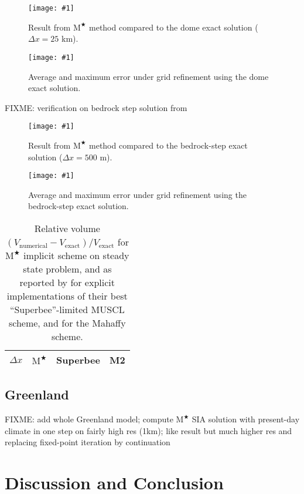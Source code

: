 \documentclass[twocolumn,letterpaper]{igs}
\newcommand{\onecol}[1]{\texttt{[image: \#1]}}
\newcommand{\Mstar}{$\text{M}^{\bigstar}$\xspace}
\begin{document}
\begin{figure}[ht]
\onecol{domeprofile.pdf}
\caption{Result from \Mstar method compared to the dome exact solution ($\Delta x=25$ km).}
\label{fig:domeprofile}
\end{figure}

\begin{figure}[ht]
\onecol{domeverif.pdf}
\caption{Average and maximum error under grid refinement using the dome exact solution.}
\label{fig:domeverif}
\end{figure}

FIXME: verification on bedrock step solution from \cite{JaroschSchoofAnslow2013}

\begin{figure}[ht]
\onecol{bedstepprofile.pdf}
\caption{Result from \Mstar method compared to the bedrock-step exact solution ($\Delta x=500$ m).}
\label{fig:bedstepprofile}
\end{figure}

\begin{figure}[ht]
\onecol{bedstepverif.pdf}
\caption{Average and maximum error under grid refinement using the bedrock-step exact solution.}
\label{fig:bedstepverif}
\end{figure}

\begin{table}[ht]
  \caption{Relative volume $(V_{\text{numerical}} - V_{\text{exact}}) / V_{\text{exact}}$ for \Mstar implicit scheme on steady state problem, and as reported by \cite{JaroschSchoofAnslow2013} for explicit implementations of their best ``Superbee''-limited MUSCL scheme, and for the Mahaffy scheme.}
  \vskip4mm \centering
  \begin{tabular}{lccc}
    $\Delta x$ & \Mstar & Superbee & M2 \\  \hline

  \end{tabular}
  \label{tab:bedstepvol}
\end{table}

\subsection{Greenland} 
FIXME: add whole Greenland model; compute \Mstar SIA solution with present-day climate in one step on fairly high res (1km); like \cite{JouvetBueler2012} result but much higher res and replacing fixed-point iteration by continuation 


\section{Discussion and Conclusion} \label{sec:conclusion}
\end{document}
